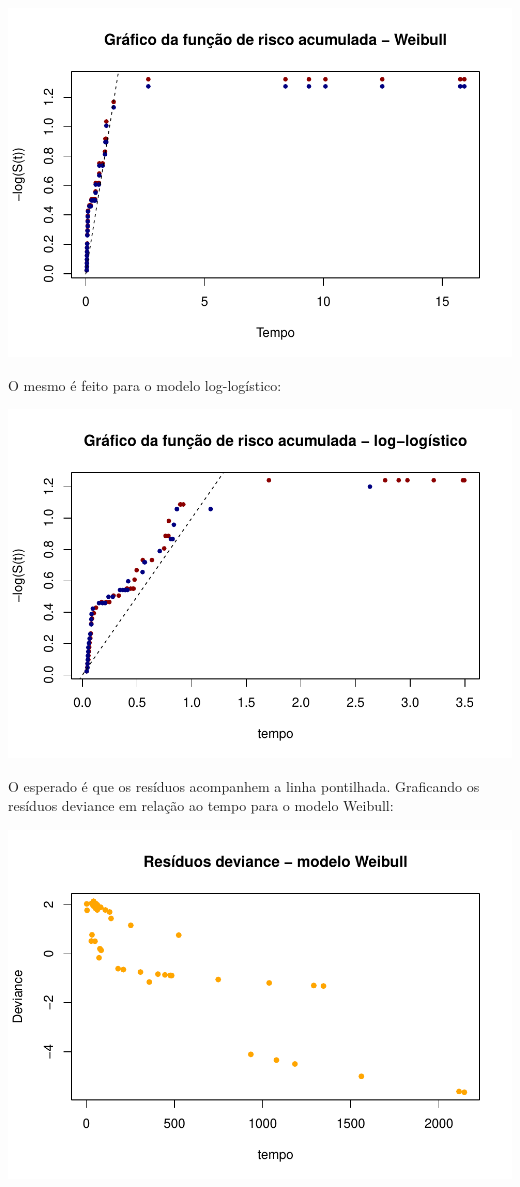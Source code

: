 \documentclass[]{article}
\begin{document}
\begin{center}\includegraphics[width=0.8\linewidth]{Lista_3_files/figure-latex/unnamed-chunk-19-1} \end{center}

O mesmo é feito para o modelo log-logístico:

\begin{center}\includegraphics[width=0.8\linewidth]{Lista_3_files/figure-latex/unnamed-chunk-20-1} \end{center}

O esperado é que os resíduos acompanhem a linha pontilhada. Graficando
os resíduos deviance em relação ao tempo para o modelo Weibull:

\begin{center}\includegraphics[width=0.8\linewidth]{Lista_3_files/figure-latex/unnamed-chunk-21-1} \end{center}
\end{document}
